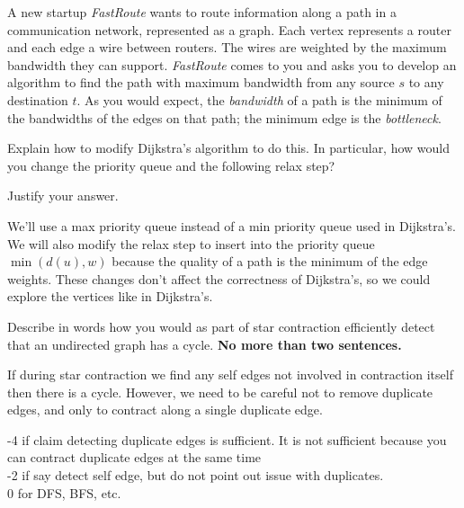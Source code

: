 \begin{problem}[5p]

A new startup \emph{FastRoute} wants to route information along a path
in a communication network, represented as a graph. Each vertex
represents a router and each edge a wire between routers. The wires
are weighted by the maximum bandwidth they can
support. \emph{FastRoute} comes to you and asks you to develop an
algorithm to find the path with maximum bandwidth from any source $s$
to any destination $t$. As you would expect, the \emph{bandwidth} of a
path is the minimum of the bandwidths of the edges on that path; the
minimum edge is the \emph{bottleneck}.

\ask
Explain how to modify Dijkstra's algorithm to do this. In particular, how would
you change the priority queue and the following relax step?

\begin{quote}
\end{quote}

Justify your answer.

\sol
  We'll use a max priority queue instead of a min priority queue used
  in Dijkstra's. We will also modify the relax step to insert into the
  priority queue $\min(d(u), w)$ because the quality of a path is the
  minimum of the edge weights. These changes don't affect the
  correctness of Dijkstra's, so we could explore the vertices like in
  Dijkstra's.
\end{problem}


%

\begin{problem}
\ask
Describe in words how you would as part of star contraction 
efficiently detect that an undirected graph has a cycle.  \textbf{No more than two sentences.}

\sol
If during star contraction we find any self edges not involved in
contraction itself then there is a cycle.   However,
we need to be careful not to remove duplicate edges, and only to
contract along a single duplicate edge.

-4 if claim detecting duplicate edges is sufficient.  It is not sufficient because you can contract duplicate edges at the same time\\
%
-2 if say detect self edge, but do not point out issue with duplicates.\\
%
0 for DFS, BFS, etc.
\end{problem}


